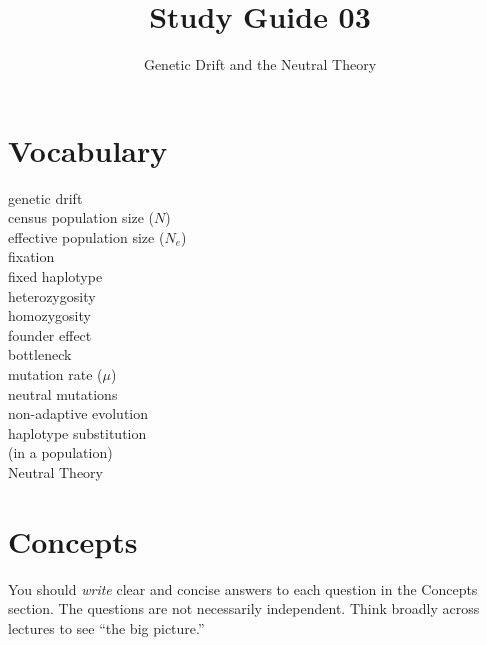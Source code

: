 \documentclass[letterpaper]{tufte-handout}
\title{Study Guide 03\hfill}
\author{Genetic Drift and the Neutral Theory}
\date{} %
\begin{document}
\maketitle	%


\section{Vocabulary}
\vspace{-1\baselineskip}
\begin{multicols}{2}
genetic drift\\
census population size ($N$)\\
effective population size ($N_e$)\\
fixation\\
fixed haplotype\\
heterozygosity\\
homozygosity\\
founder effect\\
bottleneck\\
mutation rate ($\mu$)\\
neutral mutations\\
non-adaptive evolution\\
haplotype substitution\\\hspace{1em}(in a population)\\
Neutral Theory
\end{multicols}

\section{Concepts}

You should \emph{write} clear and concise answers to each question in the Concepts section.  The questions are not necessarily independent.  Think broadly across lectures to see ``the big picture.'' 
\end{document}
